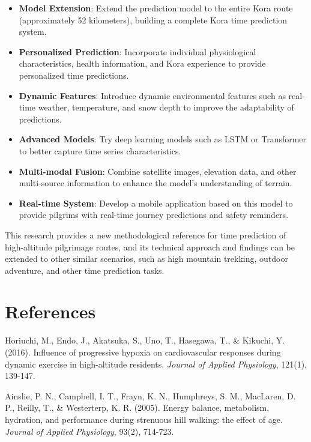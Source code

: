 \documentclass[12pt]{article}
\begin{document}
\begin{itemize}
  \item \textbf{Model Extension}: Extend the prediction model to the entire Kora route (approximately 52 kilometers), building a complete Kora time prediction system.
  \item \textbf{Personalized Prediction}: Incorporate individual physiological characteristics, health information, and Kora experience to provide personalized time predictions.
  \item \textbf{Dynamic Features}: Introduce dynamic environmental features such as real-time weather, temperature, and snow depth to improve the adaptability of predictions.
  \item \textbf{Advanced Models}: Try deep learning models such as LSTM or Transformer to better capture time series characteristics.
  \item \textbf{Multi-modal Fusion}: Combine satellite images, elevation data, and other multi-source information to enhance the model's understanding of terrain.
  \item \textbf{Real-time System}: Develop a mobile application based on this model to provide pilgrims with real-time journey predictions and safety reminders.
\end{itemize}

This research provides a new methodological reference for time prediction of high-altitude pilgrimage routes, and its technical approach and findings can be extended to other similar scenarios, such as high mountain trekking, outdoor adventure, and other time prediction tasks.

\section{References}


\begin{thebibliography}{99}

Horiuchi, M., Endo, J., Akatsuka, S., Uno, T., Hasegawa, T., \& Kikuchi, Y. (2016).
Influence of progressive hypoxia on cardiovascular responses during dynamic exercise in high-altitude residents.
\textit{Journal of Applied Physiology}, 121(1), 139-147.

Ainslie, P. N., Campbell, I. T., Frayn, K. N., Humphreys, S. M., MacLaren, D. P., Reilly, T., \& Westerterp, K. R. (2005).
Energy balance, metabolism, hydration, and performance during strenuous hill walking: the effect of age.
\textit{Journal of Applied Physiology}, 93(2), 714-723.

\end{thebibliography}
\end{document}
